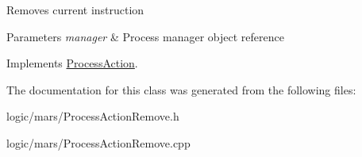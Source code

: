 Removes current instruction 
\begin{DoxyParams}{Parameters}
{\em manager} & Process manager object reference \\
\hline
\end{DoxyParams}


Implements \hyperlink{classProcessAction}{Process\+Action}.



The documentation for this class was generated from the following files\+:\begin{DoxyCompactItemize}
\item 
logic/mars/Process\+Action\+Remove.\+h\item 
logic/mars/Process\+Action\+Remove.\+cpp\end{DoxyCompactItemize}
